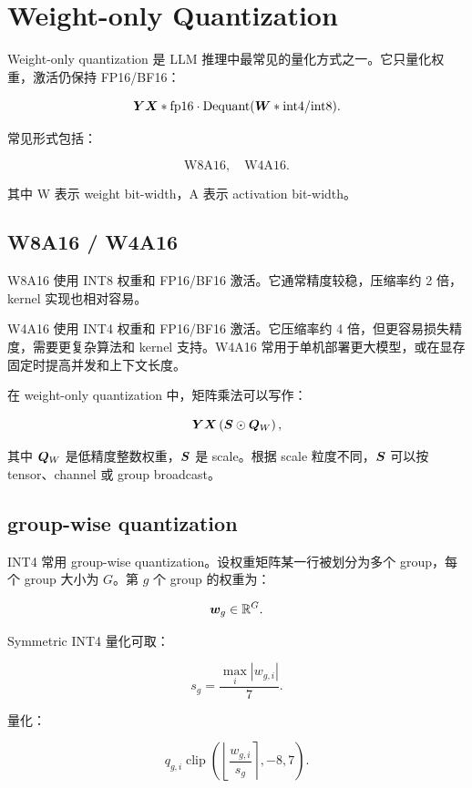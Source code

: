\section{Weight-only Quantization}
\label{sec:weight-only-quantization}

Weight-only quantization 是 LLM 推理中最常见的量化方式之一。它只量化权重，激活仍保持 FP16/BF16：

\[
\bm{Y}
\bm{X}*{\mathrm{fp16}}
\cdot
\operatorname{Dequant}(\bm{W}*{\mathrm{int4/int8}}).
\]

常见形式包括：

\[
\text{W8A16},
\quad
\text{W4A16}.
\]

其中 W 表示 weight bit-width，A 表示 activation bit-width。

\subsection{W8A16 / W4A16}
\label{subsec:w8a16-w4a16}

W8A16 使用 INT8 权重和 FP16/BF16 激活。它通常精度较稳，压缩率约 2 倍，kernel 实现也相对容易。

W4A16 使用 INT4 权重和 FP16/BF16 激活。它压缩率约 4 倍，但更容易损失精度，需要更复杂算法和 kernel 支持。W4A16 常用于单机部署更大模型，或在显存固定时提高并发和上下文长度。

在 weight-only quantization 中，矩阵乘法可以写作：

\[
\bm{Y}
\bm{X}
\left(
\bm{S}\odot
\bm{Q}_W
\right),
\]

其中 $\bm{Q}_W$ 是低精度整数权重，$\bm{S}$ 是 scale。根据 scale 粒度不同，$\bm{S}$ 可以按 tensor、channel 或 group broadcast。

\subsection{group-wise quantization}
\label{subsec:group-wise-weight-quantization}

INT4 常用 group-wise quantization。设权重矩阵某一行被划分为多个 group，每个 group 大小为 $G$。第 $g$ 个 group 的权重为：

\[
\bm{w}_g\in\mathbb{R}^{G}.
\]

Symmetric INT4 量化可取：

\[
s_g=
\frac{\max_i |w_{g,i}|}{7}.
\]

量化：

\[
q_{g,i}
\operatorname{clip}
\left(
\left\lfloor
\frac{w_{g,i}}{s_g}
\right\rceil,
-8,
7
\right).
\]

